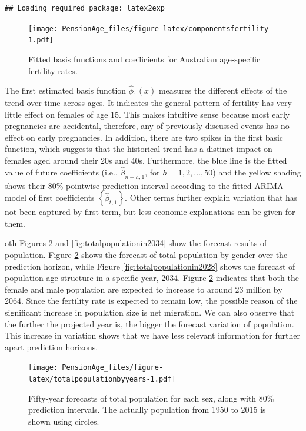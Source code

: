 \documentclass[11pt,a4paper,]{article}
\begin{document}
\begin{verbatim}
## Loading required package: latex2exp
\end{verbatim}

\begin{figure}
\centering
\texttt{[image: PensionAge\_files/figure-latex/componentsfertility-1.pdf]}
\caption{\label{fig:componentsfertility}Fitted basis functions and coefficients for Australian age-specific fertility rates.}
\end{figure}

The first estimated basis function \(\widehat{\phi}_1(x)\) measures the different effects of the trend over time across ages. It indicates the general pattern of fertility has very little effect on females of age 15. This makes intuitive sense because most early pregnancies are accidental, therefore, any of previously discussed events has no effect on early pregnancies. In addition, there are two spikes in the first basic function, which suggests that the historical trend has a distinct impact on females aged around their 20s and 40s. Furthermore, the blue line is the fitted value of future coefficients (i.e., \(\widehat{\beta}_{n+h,1}\), for \(h=1,2,\dots,50\)) and the yellow shading shows their 80\% pointwise prediction interval according to the fitted ARIMA model of first coefficients \(\left\{\widehat{\beta}_{t,1}\right\}\). Other terms further explain variation that has not been captured by first term, but less economic explanations can be given for them.

oth Figures \ref{fig:totalpopulationbyyears} and \ref{fig:totalpopulationin2034} show the forecast results of population. Figure \ref{fig:totalpopulationbyyears} shows the forecast of total population by gender over the prediction horizon, while Figure \ref{fig:totalpopulationin2028} shows the forecast of population age structure in a specific year, 2034. Figure \ref{fig:totalpopulationbyyears} indicates that both the female and male population are expected to increase to around 23 million by 2064. Since the fertility rate is expected to remain low, the possible reason of the significant increase in population size is net migration. We can also observe that the further the projected year is, the bigger the forecast variation of population. This increase in variation shows that we have less relevant information for further apart prediction horizons.

\begin{figure}
\centering
\texttt{[image: PensionAge\_files/figure-latex/totalpopulationbyyears-1.pdf]}
\caption{\label{fig:totalpopulationbyyears}Fifty-year forecasts of total population for each sex, along with 80\% prediction intervals. The actually population from 1950 to 2015 is shown using circles.}
\end{figure}
\end{document}
